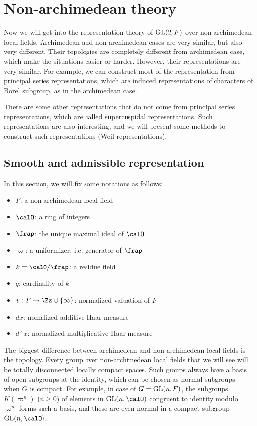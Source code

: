 \newpage

\section{Non-archimedean theory}
Now we will get into the representation theory of $\mathrm{GL}(2, F)$ over non-archimedean local fields. Archimedean and non-archimedean cases are very similar, but also very different. 
Their topologies are completely different from archimedean case, which make the situations easier or harder. However, their representations are very similar. For example, we can construct most of the representation from principal series representations, which are induced representations of characters of Borel subgroup, as in the archimedean case. 

There are some other representations that do not come from principal series representations, which are called supercuspidal representations. Such representations are also interesting, and we will present some methods to construct such representations (Weil representations). 

\subsection{Smooth and admissible representation}
In this section, we will fix some notations as follows:
\begin{itemize}
\item $F$: a non-archimedean local field
\item $\calO$: a ring of integers
\item $\frap$: the unique maximal ideal of $\calO$
\item $\varpi$: a uniformizer, i.e. generator of $\frap$
\item $k = \calO / \frap$: a residue field
\item $q$: cardinality of $k$
\item $v:F\to \Zz\cup\{\infty\}$: normalized valuation of $F$
\item $dx$: nomalized additive Haar measure
\item $d^{\times}x$: normalized multiplicative Haar measure
\end{itemize}
The biggest difference between archimedean and non-archimedean local fields is the topology. Every group over non-archimedean local fields that we will see will be totally disconnected locally compact spaces. 
Such groups always have a basis of open subgroups at the identity, which can be chosen as normal subgroups when $G$ is compact. 
For example, in case of $G = \mathrm{GL}(n, F)$, the subgroups $K(\varpi^{n})$ ($n\geq0$) of elements in $\GL(n, \calO)$ congruent to identity modulo $\varpi^{n}$ forms such a basis, and these are even normal in a compact subgroup $\GL(n, \calO)$. 


